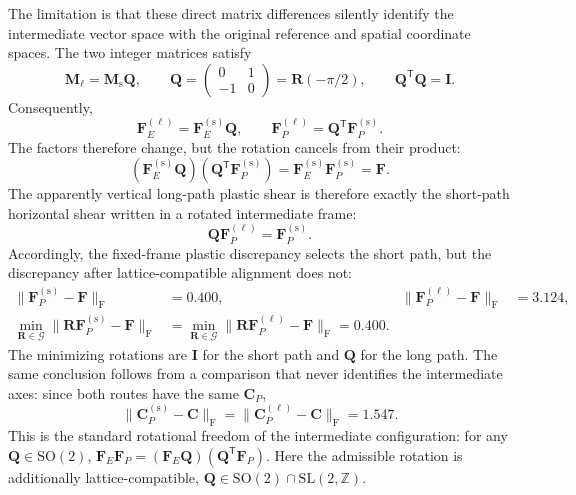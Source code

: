 \documentclass[11pt]{article}
\newcommand{\trans}{\mathsf{T}}
\newcommand{\shortp}{\mathrm{s}}
\newcommand{\longp}{\ell}
\newcommand{\Frob}{\mathrm{F}}
\newcommand{\SO}{\mathrm{SO}(2)}
\newcommand{\SLZ}{\mathrm{SL}(2,\mathbb{Z})}
\begin{document}
The limitation is that these direct matrix differences silently identify the
intermediate vector space with the original reference and spatial coordinate
spaces.  The two integer matrices satisfy
\begin{equation}
 \mathbf M_{\longp}=\mathbf M_{\shortp}\mathbf Q,
 \qquad
 \mathbf Q=
 \begin{pmatrix}0&1\\-1&0\end{pmatrix}
 =\mathbf R(-\pi/2),
 \qquad
 \mathbf Q^\trans\mathbf Q=\mathbf I.
 \label{eq:Qrelation}
\end{equation}
Consequently,
\begin{equation}
 \mathbf F_E^{(\longp)}=\mathbf F_E^{(\shortp)}\mathbf Q,
 \qquad
 \mathbf F_P^{(\longp)}=\mathbf Q^\trans\mathbf F_P^{(\shortp)}.
 \label{eq:gaugepair}
\end{equation}
The factors therefore change, but the rotation cancels from their product:
\begin{equation}
 (\mathbf F_E^{(\shortp)}\mathbf Q)
 (\mathbf Q^\trans\mathbf F_P^{(\shortp)})
 =\mathbf F_E^{(\shortp)}\mathbf F_P^{(\shortp)}=\mathbf F.
\end{equation}
The apparently vertical long-path plastic shear is therefore exactly the
short-path horizontal shear written in a rotated intermediate frame:
\begin{equation}
 \mathbf Q\mathbf F_P^{(\longp)}
 =\mathbf F_P^{(\shortp)}.
 \label{eq:alignplastic}
\end{equation}
Accordingly, the fixed-frame plastic discrepancy selects the short path, but
the discrepancy after lattice-compatible alignment does not:
\begin{align}
 \lVert\mathbf F_P^{(\shortp)}-\mathbf F\rVert_{\Frob}
 &=0.400,
 &
 \lVert\mathbf F_P^{(\longp)}-\mathbf F\rVert_{\Frob}
 &=3.124,
 \\
 \min_{\mathbf R\in\mathcal G}
 \lVert\mathbf R\mathbf F_P^{(\shortp)}-\mathbf F\rVert_{\Frob}
 &=
 \min_{\mathbf R\in\mathcal G}
 \lVert\mathbf R\mathbf F_P^{(\longp)}-\mathbf F\rVert_{\Frob}
 =0.400.
 \label{eq:alignedplasticdistance}
\end{align}
The minimizing rotations are \(\mathbf I\) for the short path and
\(\mathbf Q\) for the long path.  The same conclusion follows from a
comparison that never identifies the intermediate axes: since both routes
have the same \(\mathbf C_P\),
\begin{equation}
 \lVert\mathbf C_P^{(\shortp)}-\mathbf C\rVert_{\Frob}
 =
 \lVert\mathbf C_P^{(\longp)}-\mathbf C\rVert_{\Frob}
 =1.547.
 \label{eq:plasticmetricdistance}
\end{equation}
This is the standard rotational freedom of the intermediate configuration:
for any \(\mathbf Q\in\SO\),
\(
 \mathbf F_E\mathbf F_P
 =(\mathbf F_E\mathbf Q)(\mathbf Q^\trans\mathbf F_P)
\).
Here the admissible rotation is additionally lattice-compatible,
\(\mathbf Q\in\SO\cap\SLZ\).
\end{document}
